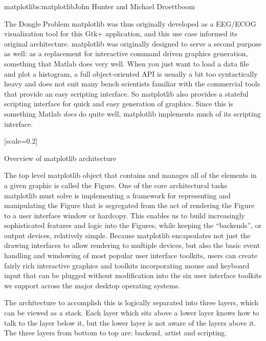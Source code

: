 \begin{aosachapter}{matplotlib}{s:matplotlib}{John Hunter and Michael Droettboom}
\begin{aosasect1}{The Dongle Problem}
matplotlib was thus originally developed as a EEG/ECOG visualization
tool for this Gtk+ application, and this use case informed its
original architecture.  matplotlib was originally designed to serve a
second purpose as well: as a replacement for interactive command
driven graphics generation, something that Matlab does very well.
When you just want to load a data file and plot a histogram, a full
object-oriented API is usually a bit too syntactically heavy and does
not suit many bench scientists familiar with the commercial tools that
provide an easy scripting interface.  So matplotlib also provides a
stateful scripting interface for quick and easy generation of
graphics.  Since this is something Matlab \emph{does} do quite well,
matplotlib implements much of its scripting interface.

[scale=0.2]
\end{aosasect1}

\begin{aosasect1}{Overview of matplotlib architecture}


The top level matplotlib object that contains and manages all of the
elements in a given graphic is called the Figure.  One of the core
architectural tasks matplotlib must solve is implementing a framework
for representing and manipulating the Figure that is segregated from
the act of rendering the Figure to a user interface window or
hardcopy.  This enables us to build increasingly sophisticated
features and logic into the Figures, while keeping the ``backends'', or
output devices, relatively simple.  Because matplotlib encapsulates
not just the drawing interfaces to allow rendering to multiple
devices, but also the basic event handling and windowing of most
popular user interface toolkits, users can create fairly rich
interactive graphics and toolkits incorporating mouse and keyboard
input that can be plugged without modification into the six user
interface toolkits we support across the major desktop operating
systems.

The architecture to accomplish this is logically separated into three
layers, which can be viewed as a stack.  Each layer which sits above a
lower layer knows how to talk to the layer below it, but the lower
layer is not aware of the layers above it.  The three layers from
bottom to top are: backend, artist and scripting.


\end{aosasect1}
\end{aosachapter}
